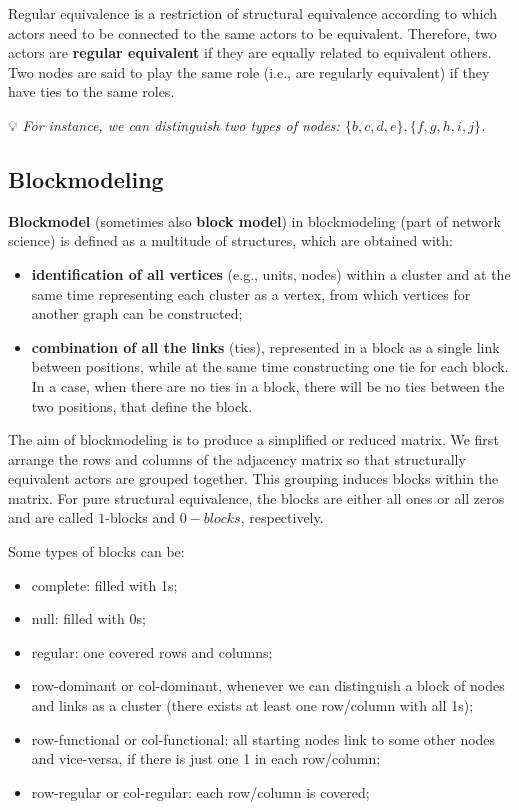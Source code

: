 \documentclass[
  notitlepage,
  onecolumn,
  openany]{book}
\providecommand{\tightlist}{%
  \setlength{\itemsep}{0pt}\setlength{\parskip}{0pt}}
\begin{document}
Regular equivalence is a restriction of structural equivalence according to which actors need to be connected to the same actors to be equivalent. Therefore, two actors are \textbf{regular equivalent} if they are equally related to equivalent others. Two nodes are said to play the same role (i.e., are regularly equivalent) if they have ties to the same roles.

💡 \emph{For instance, we can distinguish two types of nodes: \(\{b,c,d,e\}, \{f,g,h,i,j\}\).}

\hypertarget{blockmodeling}{%
\subsection{Blockmodeling}\label{blockmodeling}}

\textbf{Blockmodel} (sometimes also \textbf{block model}) in blockmodeling (part of network science) is defined as a multitude of structures, which are obtained with:

\begin{itemize}
\tightlist
\item
  \textbf{identification of all vertices} (e.g., units, nodes) within a cluster and at the same time representing each cluster as a vertex, from which vertices for another graph can be constructed;
\item
  \textbf{combination of all the links} (ties), represented in a block as a single link between positions, while at the same time constructing one tie for each block. In a case, when there are no ties in a block, there will be no ties between the two positions, that define the block.
\end{itemize}

The aim of blockmodeling is to produce a simplified or reduced matrix. We first arrange the rows and columns of the adjacency matrix so that structurally equivalent actors are grouped together. This grouping induces blocks within the matrix. For pure structural equivalence, the blocks are either all ones or all zeros and are called \(1\)-blocks and \(0-blocks\), respectively.

Some types of blocks can be:

\begin{itemize}
\tightlist
\item
  complete: filled with 1s;
\item
  null: filled with 0s;
\item
  regular: one covered rows and columns;
\item
  row-dominant or col-dominant, whenever we can distinguish a block of nodes and links as a cluster (there exists at least one row/column with all 1s);
\item
  row-functional or col-functional: all starting nodes link to some other nodes and vice-versa, if there is just one 1 in each row/column;
\item
  row-regular or col-regular: each row/column is covered;
\end{itemize}
\end{document}
